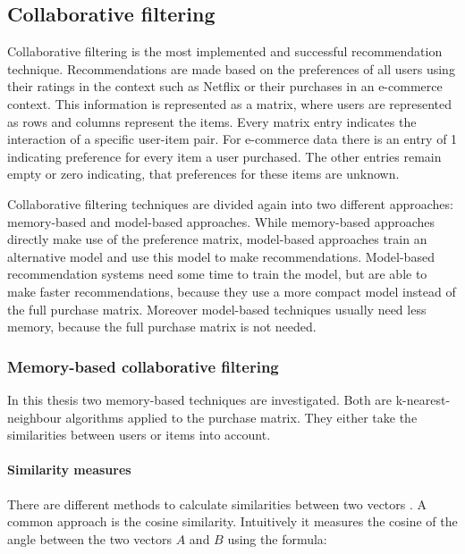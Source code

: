 \documentclass[10pt]{reportMaster}
\begin{document}
\subsection*{Collaborative filtering}
\label{sec:collaborativeFiltering}
\label{rs_cf}

Collaborative filtering is the most implemented and successful recommendation technique.
Recommendations are made based on the preferences of all users using their ratings in the context such as Netflix or their purchases in an e-commerce context.
This information is represented as a matrix, where users are represented as rows and columns represent the items.
Every matrix entry indicates the interaction of a specific user-item pair.
For e-commerce data there is an entry of 1 indicating preference for every item a user purchased.
The other entries remain empty or zero indicating, that preferences for these items are unknown.

Collaborative filtering techniques are divided again into two different approaches: memory-based and model-based approaches.
While memory-based approaches directly make use of the preference matrix, model-based approaches train an alternative model and use this model to make recommendations.
Model-based recommendation systems need some time to train the model, but are able to make faster recommendations, because they use a more compact model instead of the full purchase matrix.
Moreover model-based techniques usually need less memory, because the full purchase matrix is not needed.

\subsubsection{Memory-based collaborative filtering}
\label{sec:memBasedCF}

In this thesis two memory-based techniques are investigated.
Both are k-nearest-neighbour algorithms applied to the purchase matrix.
They either take the similarities between users or items into account.

\paragraph{Similarity measures}
\label{par:simMeasures}
There are different methods to calculate similarities between two vectors \cite{dataMining}.
A common approach is the cosine similarity.
Intuitively it measures the cosine of the angle between the two vectors $A$ and $B$ using the formula:
\end{document}
